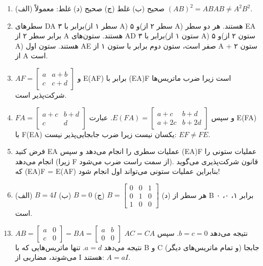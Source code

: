 \documentclass[12pt,a4paper]{article}
\begin{document}
{\begin{enumerate}
			\item (الف) صحیح (ب) غلط (ج) صحیح (د) غلط: معمولاً $(AB)^2 = ABAB \neq A^2B^2$.
			
			\item سطرهای DA برابر با ۳(سطر ۱ از A) و ۵(سطر ۲ از A) هستند. هر دو سطر EA برابر سطر ۲ از A هستند. ستون‌های AD برابر با ۳(ستون ۱ از A) و ۵(ستون ۲ از A) هستند. ستون اول AE صفر است، ستون دوم برابر با ستون ۱ از A + ستون ۲ از A است.
			
			\item $AF = \begin{bmatrix} a & a+b \\ c & c+d \end{bmatrix}$ و E(AF) برابر با (EA)F است زیرا ضرب ماتریس‌ها شرکت‌پذیر است.
			
			\item $FA = \begin{bmatrix} a+c & b+d \\ c & d \end{bmatrix}$ و سپس $E(FA) = \begin{bmatrix} a+c & b+d \\ a+2c & b+2d \end{bmatrix}$. عبارت E(FA) با F(EA) یکسان نیست زیرا ضرب جابجایی‌پذیر نیست: $EF \neq FE$.
			
			\item فرض کنید EA عملیات سطری را انجام می‌دهد و سپس (EA)F عملیات ستونی را انجام می‌دهد (زیرا F از سمت راست ضرب می‌شود). قانون شرکت‌پذیری می‌گوید که (EA)F = E(AF) بنابراین عملیات ستونی می‌تواند اول انجام شود!
			
			\item (الف) $B=4I$ (ب) $B=0$ (ج) $B = \begin{bmatrix} 0 & 0 & 1 \\ 0 & 1 & 0 \\ 1 & 0 & 0 \end{bmatrix}$ (د) هر سطر از B برابر ۱، ۰، ۰ است.
		\end{enumerate}
		
		
		\begin{enumerate}
			\setcounter{enumi}{12}
			\item $AB = \begin{bmatrix} a & 0 \\ c & 0 \end{bmatrix} = BA = \begin{bmatrix} a & b \\ 0 & 0 \end{bmatrix}$ نتیجه می‌دهد $b=c=0$. سپس $AC=CA$ نتیجه می‌دهد $a=d$. تنها ماتریس‌هایی که با B و C (و تمام ماتریس‌های دیگر) جابجا می‌شوند، مضاربی از I هستند: $A=aI$.
			

\end{enumerate}}
\end{document}
